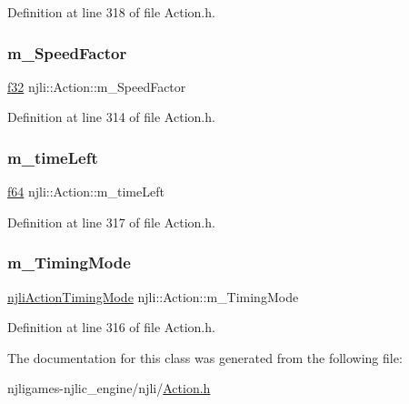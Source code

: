 Definition at line 318 of file Action.\+h.

\mbox{\label{classnjli_1_1_action_a650426751b72971d7d92cf0edf3fc364}} 
\subsubsection{\texorpdfstring{m\+\_\+\+Speed\+Factor}{m\_SpeedFactor}}
{\footnotesize\ttfamily \mbox{\hyperlink{_util_8h_a5f6906312a689f27d70e9d086649d3fd}{f32}} njli\+::\+Action\+::m\+\_\+\+Speed\+Factor\hspace{0.3cm}{\ttfamily [private]}}



Definition at line 314 of file Action.\+h.

\mbox{\label{classnjli_1_1_action_ab82c9d7ba3c11ef73b38f04a136cb87b}} 
\subsubsection{\texorpdfstring{m\+\_\+time\+Left}{m\_timeLeft}}
{\footnotesize\ttfamily \mbox{\hyperlink{_util_8h_a94dab5770726ccbef8c7d026cfbdf8e5}{f64}} njli\+::\+Action\+::m\+\_\+time\+Left\hspace{0.3cm}{\ttfamily [private]}}



Definition at line 317 of file Action.\+h.

\mbox{\label{classnjli_1_1_action_a3ae742326e7c2cfdd86b816816256f3d}} 
\subsubsection{\texorpdfstring{m\+\_\+\+Timing\+Mode}{m\_TimingMode}}
{\footnotesize\ttfamily \mbox{\hyperlink{namespacenjli_affc383078a5935be1509062828a1824b}{njli\+Action\+Timing\+Mode}} njli\+::\+Action\+::m\+\_\+\+Timing\+Mode\hspace{0.3cm}{\ttfamily [private]}}



Definition at line 316 of file Action.\+h.



The documentation for this class was generated from the following file\+:\begin{DoxyCompactItemize}
\item 
njligames-\/njlic\+\_\+engine/njli/\mbox{\hyperlink{_action_8h}{Action.\+h}}\end{DoxyCompactItemize}
